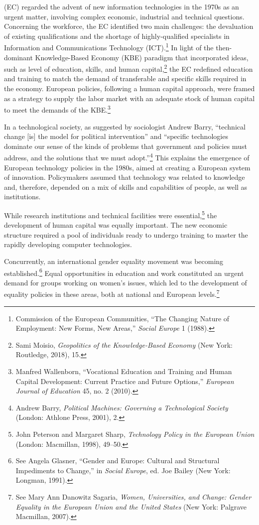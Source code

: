 \documentclass{tufte-handout}
\begin{document}
 (EC) regarded the advent of new information
technologies in the 1970s as an urgent matter, involving complex
economic, industrial and technical questions. Concerning the workforce,
the EC identified two main challenges: the devaluation of existing
qualifications and the shortage of highly-qualified specialists in
Information and Communications Technology (ICT).\footnote{Commission of
  the European Communities, ``The Changing Nature of Employment: New
  Forms, New Areas,'' \emph{Social Europe} 1 (1988).} In light of the
then-dominant Knowledge-Based Economy (KBE) paradigm that incorporated
ideas, such as level of education, skills, and human capital,\footnote{Sami
  Moisio, \emph{Geopolitics of the Knowledge-Based Economy} (New York:
  Routledge, 2018), 15.} the EC redefined education and training to
match the demand of transferable and specific skills required in the
economy. European policies, following a human capital approach, were
framed as a strategy to supply the labor market with an adequate stock
of human capital to meet the demands of the KBE.\footnote{Manfred
  Wallenborn, ``Vocational Education and Training and Human Capital
  Development: Current Practice and Future Options,'' \emph{European
  Journal of Education} 45, no. 2 (2010).}

In a technological society, as suggested by sociologist Andrew Barry,
``technical change {[}is{]} the model for political intervention'' and
``specific technologies dominate our sense of the kinds of problems that
government and policies must address, and the solutions that we must
adopt.''\footnote{Andrew Barry, \emph{Political Machines: Governing a
  Technological Society} (London: Athlone Press, 2001), 2.} This
explains the emergence of European technology policies in the 1980s,
aimed at creating a European system of innovation. Policymakers assumed
that technology was related to knowledge and, therefore, depended on a
mix of skills and capabilities of people, as well as institutions.

While research institutions and technical facilities were
essential,\footnote{John Peterson and Margaret Sharp, \emph{Technology
  Policy in the European Union} (London: Macmillan, 1998), 49--50.} the
development of human capital was equally important. The new economic
structure required a pool of individuals ready to undergo training to
master the rapidly developing computer technologies.

Concurrently, an international gender equality movement was becoming
established.\footnote{See Angela Glasner, ``Gender and Europe: Cultural
  and Structural Impediments to Change,'' in \emph{Social Europe}, ed.
  Joe Bailey (New York: Longman, 1991).} Equal opportunities in
education and work constituted an urgent demand for groups working on
women's issues, which led to the development of equality policies in
these areas, both at national and European levels.\footnote{See Mary Ann
  Danowitz Sagaria, \emph{Women, Universities, and Change: Gender
  Equality in the European Union and the United States} (New York:
  Palgrave Macmillan, 2007).}
\end{document}

